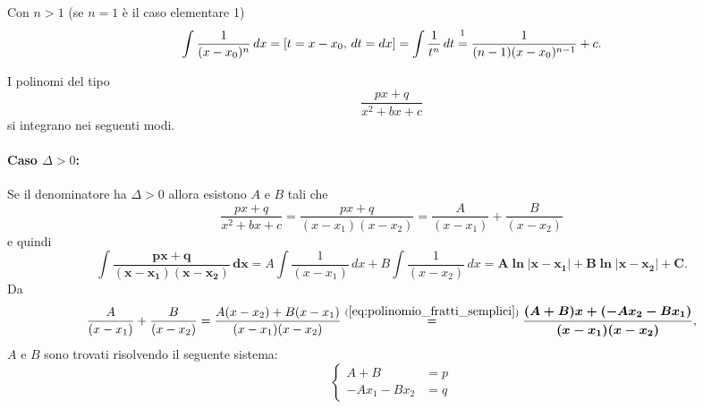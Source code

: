 \begin{definition}[Elementare 4]
    Con $n>1$ (se $n=1$ è il caso elementare 1)
    \begin{equation*}
        \int\frac{1}{(x-x_0)^n}\, dx=[t=x-x_0,\,  dt=dx]=\int\frac{1}{t^n}\, dt\overset{\footnotemark}{=}\frac{1}{(n-1)(x-x_0)^{n-1}}+c.
    \end{equation*}
\end{definition}

I polinomi del tipo
\begin{equation}\label{eq:polinomio_fratti_semplici}
    \frac{px+q}{x^2+bx+c}
\end{equation}
si integrano nei seguenti modi.

\paragraph{Caso $\Delta
>0$:} Se il denominatore ha $\Delta>0$ allora esistono $A$ e $B$ tali che
\begin{equation*}
    \frac{px+q}{x^2+bx+c} = \frac{px+q}{(x-x_1)(x-x_2)} = \frac{A}{(x-x_1)} + \frac{B}{(x-x_2)}
\end{equation*}
e quindi
\begin{equation*}
    \boldsymbol{\int\frac{px+q}{(x-x_1)(x-x_2)}\,dx =} A\int\frac{1}{(x-x_1)}\,dx + B\int\frac{1}{(x-x_2)}\,dx =\boldsymbol{A\ln|x-x_1|+B\ln|x-x_2|+C.}
\end{equation*}
Da
\begin{equation*}
    \frac{A}{(x-x_1)} + \frac{B}{(x-x_2)}=\frac{A(x-x_2)+B(x-x_1)}{(x-x_1)(x-x_2)}\overset{(\ref{eq:polinomio_fratti_semplici})}{=}\boldsymbol{\frac{(A+B)x+(-Ax_2-Bx_1)}{(x-x_1)(x-x_2)}},
\end{equation*}
$A$ e $B$ sono trovati risolvendo il seguente sistema:
\begin{equation*}
    \begin{cases}
        A+B &= p\\
        -Ax_1-Bx_2 &= q
    \end{cases}
\end{equation*}

